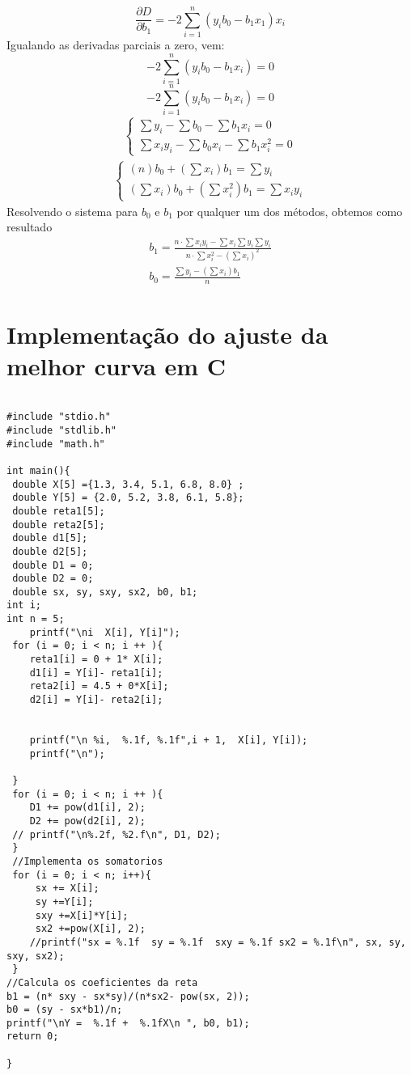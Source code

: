 \documentclass{article}
\begin{document}
\begin{equation}
    \frac{\partial D}{\partial b_1} = -2 \sum_{i = 1}^n(y_i b_0 -b_1x_1)x_i
\end{equation}
Igualando as derivadas parciais a zero, vem: 
\begin{equation*}
  -2 \sum_{i = 1}^n(y_i b_0 -b_1x_i) = 0
\end{equation*}
\begin{equation*}
 -2 \sum_{i = 1}^n(y_i b_0 -b_1x_i) = 0
\end{equation*}
\begin{eqnarray}
\begin{cases}
\sum y_i - \sum b_0 - \sum b_1 x_i = 0 \\
\sum x_i y_i - \sum b_0 x_i - \sum b_1 x_i^2 = 0 
\end{cases}
\end{eqnarray}
\begin{eqnarray}
\begin{cases}
 (n) b_0 + (\sum x_i) b_1 = \sum y_i  \\
 (\sum  x_i)b_0 + (\sum x_i^2)b_1  = \sum x_i y_i 
\end{cases}
\end{eqnarray}
Resolvendo o sistema para $b_0$ e $b_1$ por qualquer um dos métodos, obtemos como resultado 
\begin{eqnarray}
b_1 = \frac{n \cdot \sum x_i y_i - \sum x_i \sum y_i \sum y_i}{n\cdot \sum x_i^2 - (\sum x_i)^2} \\ 
b_0 = \frac{\sum y_i - (\sum x_i)b_1}{n}
\end{eqnarray}
\section{Implementação do ajuste da melhor curva em C}

\begin{lstlisting} 

#include "stdio.h"
#include "stdlib.h"
#include "math.h"

int main(){
 double X[5] ={1.3, 3.4, 5.1, 6.8, 8.0} ; 
 double Y[5] = {2.0, 5.2, 3.8, 6.1, 5.8}; 
 double reta1[5]; 
 double reta2[5]; 
 double d1[5];
 double d2[5];  
 double D1 = 0;
 double D2 = 0;  
 double sx, sy, sxy, sx2, b0, b1; 
int i; 
int n = 5; 
	printf("\ni  X[i], Y[i]"); 
 for (i = 0; i < n; i ++ ){
 	reta1[i] = 0 + 1* X[i];
 	d1[i] = Y[i]- reta1[i];  
 	reta2[i] = 4.5 + 0*X[i];
 	d2[i] = Y[i]- reta2[i];  


 	printf("\n %i,  %.1f, %.1f",i + 1,  X[i], Y[i]); 
	printf("\n"); 
	
 }
 for (i = 0; i < n; i ++ ){
 	D1 += pow(d1[i], 2);
 	D2 += pow(d2[i], 2); 
 //	printf("\n%.2f, %2.f\n", D1, D2); 
 }
 //Implementa os somatorios 
 for (i = 0; i < n; i++){
 	 sx += X[i]; 
 	 sy +=Y[i]; 
 	 sxy +=X[i]*Y[i];
 	 sx2 +=pow(X[i], 2);   
 	//printf("sx = %.1f  sy = %.1f  sxy = %.1f sx2 = %.1f\n", sx, sy, sxy, sx2); 
 }
//Calcula os coeficientes da reta 
b1 = (n* sxy - sx*sy)/(n*sx2- pow(sx, 2));
b0 = (sy - sx*b1)/n; 
printf("\nY =  %.1f +  %.1fX\n ", b0, b1); 
return 0; 

}
\end{lstlisting}
\end{document}
